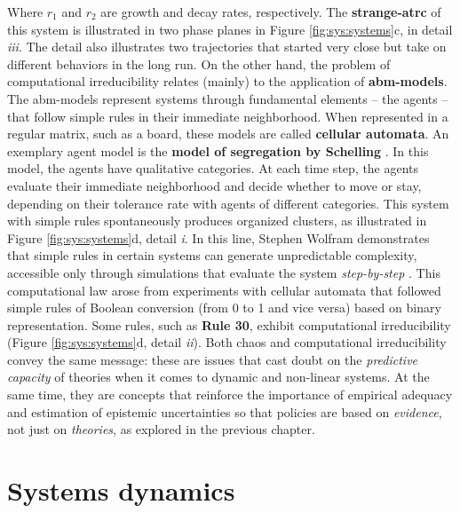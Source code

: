 \documentclass[./main_en.tex]{subfiles}
\begin{document}
Where $r_1$ and $r_2$ are growth and decay rates, respectively. The \textbf{\gls{strange-atrc}} of this \gls{system} is illustrated in two phase planes in Figure \ref{fig:sys:systems}c, in detail \textrm{\textit{iii}}. The detail also illustrates two trajectories that started very close but take on different behaviors in the long run. On the other hand, the problem of computational irreducibility relates (mainly) to the application of \textbf{\gls{abm-models}}. The \gls{abm-models} represent systems through fundamental elements – the agents – that follow simple rules in their immediate neighborhood. When represented in a regular matrix, such as a board, these models are called \textbf{cellular automata}. An exemplary agent \gls{model} is the \textbf{\gls{model} of segregation by Schelling} \cite{Schelling1971}. In this \gls{model}, the agents have qualitative categories. At each time step, the agents evaluate their immediate neighborhood and decide whether to move or stay, depending on their tolerance rate with agents of different categories. This \gls{system} with simple rules spontaneously produces organized clusters, as illustrated in Figure \ref{fig:sys:systems}d, detail \textrm{\textit{i}}. In this line, Stephen Wolfram demonstrates that simple rules in certain systems can generate unpredictable complexity, accessible only through simulations that evaluate the \gls{system} \textit{step-by-step} \cite{wolfram1984}. This computational law arose from experiments with cellular automata that followed simple rules of Boolean conversion (from 0 to 1 and vice versa) based on binary representation. Some rules, such as \textbf{Rule 30}, exhibit computational irreducibility (Figure \ref{fig:sys:systems}d, detail \textrm{\textit{ii}}). Both \gls{chaos} and computational irreducibility convey the same message: these are issues that cast doubt on the \textit{predictive capacity} of theories when it comes to dynamic and non-linear systems. At the same time, they are concepts that reinforce the importance of empirical adequacy and estimation of epistemic uncertainties so that policies are based on \textit{evidence}, not just on \textit{theories}, as explored in the previous chapter.


\section{Systems dynamics} \label{sec:sys:dynamics}
\end{document}
